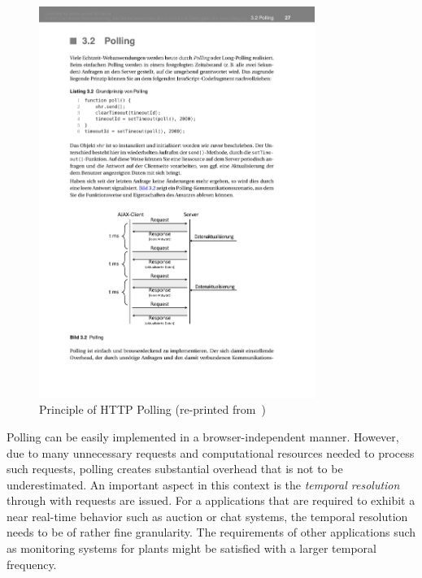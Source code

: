 \documentclass[a4paper, justified, notoc]{tufte-handout} %
\begin{document}
%
\begin{figure}%
	\centering
  \includegraphics[width=0.8\textwidth]{./src/figures/polling.pdf}
  \caption{Principle of HTTP Polling (re-printed from~\citet{gorski:2015})}
  \label{fig:polling}
\end{figure}


Polling can be easily implemented in a browser-independent manner. However, due to many unnecessary requests and computational resources needed to process such requests, polling creates substantial overhead that is not to be underestimated. An important aspect in this context is the \emph{temporal resolution} through with requests are issued. For a applications that are required to exhibit a near real-time behavior such as auction or chat systems, the temporal resolution needs to be of rather fine granularity. The requirements of other applications such as monitoring systems for plants might be satisfied with a larger temporal frequency.
\end{document}
